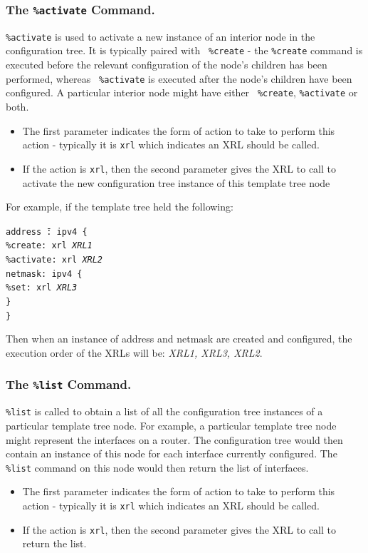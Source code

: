 \documentclass[11pt]{article}
\begin{document}
\subsubsection{The {\tt \%activate} Command.}
{\tt \%activate} is used to activate a new instance of an interior
node in the configuration tree.  It is typically paired with {\tt
\%create} - the {\tt \%create} command is executed before the relevant
configuration of the node's children has been performed, whereas {\tt
\%activate} is executed after the node's children have been
configured.  A particular interior node might have either {\tt
\%create}, {\tt \%activate} or both.
\begin{itemize}
\item The first parameter indicates the form of action to take to perform
this action - typically it is {\tt xrl} which indicates an XRL should
be called.
\item If the action is {\tt xrl}, then the second parameter gives the XRL to
call to activate the new configuration tree instance of this template
tree node
\end{itemize}

For example, if the template tree held the following:
\begin{tabbing}
\tt addr\=\tt ess \=\tt@: ipv4 \{\\
    \>\tt\%create: xrl {\it XRL1}\\
    \>\tt\%activate: xrl {\it XRL2}\\
    \>\tt netmask: ipv4 \{\\
        \>\>\tt\%set: xrl {\it XRL3}\\
    \>\tt\}\\
\tt\}
\end{tabbing}
Then when an instance of address and netmask are created and
configured, the execution order of the XRLs will be: {\it XRL1, XRL3, XRL2}.

\subsubsection{The {\tt \%list} Command.}
{\tt \%list} is called to obtain a list of all the configuration tree
instances of a particular template tree node.  For example, a
particular template tree node might represent the interfaces on a
router.  The configuration tree would then contain an instance of this
node for each interface currently configured.  The {\tt \%list}
command on this node would then return the list of interfaces.
\begin{itemize}
\item The first parameter indicates the form of action to take to perform
this action - typically it is {\tt xrl} which indicates an XRL should
be called.
\item If the action is {\tt xrl}, then the second parameter gives the XRL to
call to return the list.
\end{itemize}
\end{document}
